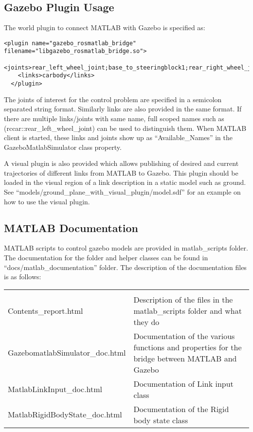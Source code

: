 \documentclass[letterpaper,10pt]{article}
\begin{document}
\subsection{Gazebo Plugin Usage}
The world plugin to connect MATLAB with Gazebo is specified as:
\small
\begin{Verbatim}[frame=single]
 <plugin name="gazebo_rosmatlab_bridge" filename="libgazebo_rosmatlab_bridge.so">
    <joints>rear_left_wheel_joint;base_to_steeringblock1;rear_right_wheel_joint</joints>
    <links>carbody</links>
  </plugin>
\end{Verbatim}
\normalsize
The joints of interest for the control problem are specified in a semicolon separated string format. Similarly links are also provided in the same format. If there are multiple links/joints with same name, full scoped names such as (rccar::rear\_left\_wheel\_joint) can be used to distinguish them. When MATLAB client is started, these links and joints show up as ``Available\_Names'' in the GazeboMatlabSimulator class property.

A visual plugin is also provided which allows publishing of desired and current trajectories of different links from MATLAB to Gazebo. This plugin should be loaded in the visual region of a link description in a static model such as ground. See ``models/ground\_plane\_with\_visual\_plugin/model.sdf'' for an example on how to use the visual plugin.

\subsection{MATLAB Documentation}
MATLAB scripts to control gazebo models are provided in matlab\_scripts folder. The documentation for the folder and helper classes can be found in ``docs/matlab\_documentation'' folder.
The description of the documentation files is as follows:

     \begin{table}[h!]
	\begin{tabular}{|p{}|p{}|}
	  \hline\\
	  Contents\_report.html & Description of the files in the matlab\_scripts folder and what they do\\ \hline
	  GazebomatlabSimulator\_doc.html & Documentation of the various functions and properties for the bridge between MATLAB and Gazebo\\ \hline
	   MatlabLinkInput\_doc.html & Documentation of Link input class \\ \hline
	   MatlabRigidBodyState\_doc.html & Documentation of the Rigid body state class\\ \hline
	\end{tabular}
      \end{table}
\end{document}
